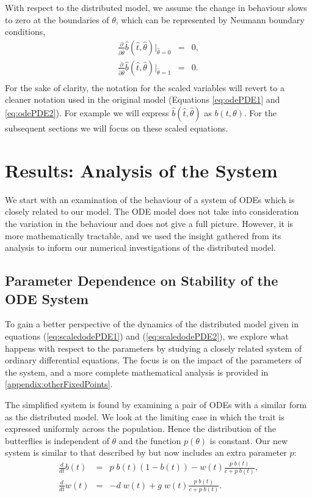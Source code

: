 \documentclass[review,authoryear]{elsarticle}
\newcommand{\origTheta}{{\theta}}
\newcommand{\scaledB}{\hat{b}}
\newcommand{\scaledTheta}{\hat{\theta}}
\newcommand{\scaledT}{\hat{t}}
\begin{document}
With respect to the distributed model, we assume the change in behaviour slows to zero at the boundaries of $\origTheta$, which can be represented by Neumann boundary conditions,
\begin{eqnarray}
  \label{eqn:PDENeumannBoundaries}
  \frac{\partial}{\partial\scaledTheta} \scaledB(\scaledT,\scaledTheta) \bigg|_{\scaledTheta=0} & = & 0, \\
  \frac{\partial}{\partial\scaledTheta} \scaledB(\scaledT,\scaledTheta) \bigg|_{\scaledTheta=1} & = & 0. \\
\end{eqnarray}
 For the sake of clarity, the notation for the scaled variables will revert to a cleaner notation used in the original model (Equations \ref{eq:odePDE1} and \ref{eq:odePDE2}). For example we will express $\scaledB(\scaledT,\scaledTheta)$ as $b(t,\theta)$. For the subsequent sections we will focus on these scaled equations.
 


\section{Results: Analysis of the System}
\label{section:analysis}

We start with an
examination of the behaviour of a system of ODEs which is closely related to our model. The ODE model does not take into consideration the variation in the behaviour and does not give a full picture. However, it is more mathematically tractable, and we used the insight gathered from its analysis to inform our numerical investigations of the distributed model.

\subsection{Parameter Dependence on Stability of the ODE System}
\label{subsection:parameters}

To gain a better perspective of the dynamics of the distributed model given in
equations (\ref{eq:scaledodePDE1}) and (\ref{eq:scaledodePDE2}), we explore what happens with respect 
to the parameters by studying  a closely related system of ordinary differential
equations.  The focus is on the impact of the parameters of the
system, and a more complete mathematical analysis is provided in 
\ref{appendix:otherFixedPoints}.

The simplified system is found by examining a pair of ODEs with a similar form
as the distributed model. We look at the limiting case in which the trait is expressed uniformly across the population. Hence the distribution of the
butterflies is independent of $\theta$ and the function $p(\theta)$ is constant. 
Our new system is similar to that described by \cite{TEWA20134825} but now
includes an extra parameter $p$:
\begin{eqnarray}
  \label{eq:scaledODE1}
  \frac{d}{dt} b(t) & = &
      p\; b(t) (1 - b(t))
      -  w(t) \frac{p\; b(t)}{c+p\; b(t)}, \\
  \label{eq:scaledODE2}
  \frac{d}{dt} w(t) & = & -d \; w(t) +
       g \; w(t) \frac{p\; b(t) }{c + p\; b(t)}.
\end{eqnarray}
\end{document}
